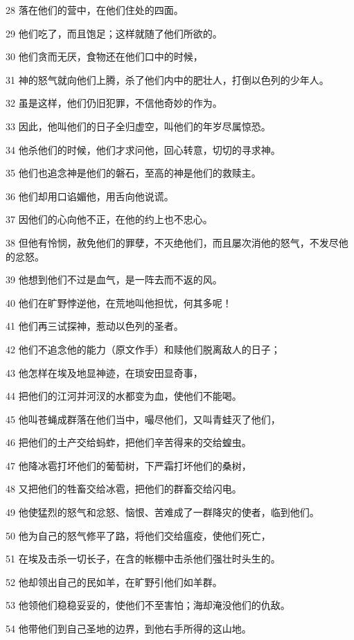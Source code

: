 \par 28 落在他们的营中，在他们住处的四面。
\par 29 他们吃了，而且饱足；这样就随了他们所欲的。
\par 30 他们贪而无厌，食物还在他们口中的时候，
\par 31 神的怒气就向他们上腾，杀了他们内中的肥壮人，打倒以色列的少年人。
\par 32 虽是这样，他们仍旧犯罪，不信他奇妙的作为。
\par 33 因此，他叫他们的日子全归虚空，叫他们的年岁尽属惊恐。
\par 34 他杀他们的时候，他们才求问他，回心转意，切切的寻求神。
\par 35 他们也追念神是他们的磐石，至高的神是他们的救赎主。
\par 36 他们却用口谄媚他，用舌向他说谎。
\par 37 因他们的心向他不正，在他的约上也不忠心。
\par 38 但他有怜悯，赦免他们的罪孽，不灭绝他们，而且屡次消他的怒气，不发尽他的忿怒。
\par 39 他想到他们不过是血气，是一阵去而不返的风。
\par 40 他们在旷野悖逆他，在荒地叫他担忧，何其多呢！
\par 41 他们再三试探神，惹动以色列的圣者。
\par 42 他们不追念他的能力（原文作手）和赎他们脱离敌人的日子；
\par 43 他怎样在埃及地显神迹，在琐安田显奇事，
\par 44 把他们的江河并河汊的水都变为血，使他们不能喝。
\par 45 他叫苍蝇成群落在他们当中，嘬尽他们，又叫青蛙灭了他们，
\par 46 把他们的土产交给蚂蚱，把他们辛苦得来的交给蝗虫。
\par 47 他降冰雹打坏他们的葡萄树，下严霜打坏他们的桑树，
\par 48 又把他们的牲畜交给冰雹，把他们的群畜交给闪电。
\par 49 他使猛烈的怒气和忿怒、恼恨、苦难成了一群降灾的使者，临到他们。
\par 50 他为自己的怒气修平了路，将他们交给瘟疫，使他们死亡，
\par 51 在埃及击杀一切长子，在含的帐棚中击杀他们强壮时头生的。
\par 52 他却领出自己的民如羊，在旷野引他们如羊群。
\par 53 他领他们稳稳妥妥的，使他们不至害怕；海却淹没他们的仇敌。
\par 54 他带他们到自己圣地的边界，到他右手所得的这山地。
